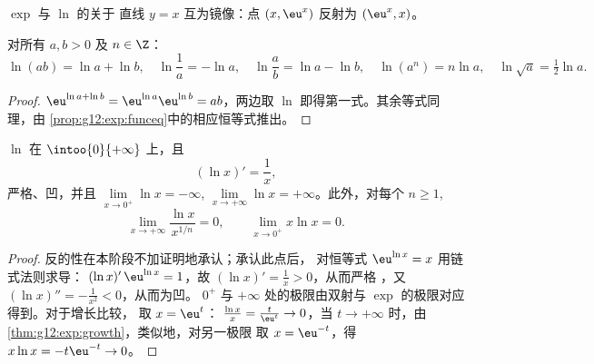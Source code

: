 \begin{omfigure}

{\small $\exp$ 与 $\ln$ 的关于
直线 $y = x$ 互为镜像：点 $(x, \eu^x)$ 反射为 $(\eu^x, x)$。}
\end{omfigure}

\begin{proposition}[代数性质]\label{prop:g12:exp:lnalg}
对所有 $a, b > 0$ 及 $n \in \Z$：
\[
\ln(ab) = \ln a + \ln b, \quad
\ln\frac{1}{a} = -\ln a, \quad
\ln\frac{a}{b} = \ln a - \ln b, \quad
\ln(a^n) = n \ln a, \quad
\ln\sqrt{a} = \tfrac12 \ln a .
\]
\end{proposition}

\begin{proof}
$\eu^{\ln a + \ln b} = \eu^{\ln a}\eu^{\ln b} = ab$，两边取 $\ln$
即得第一式。其余等式同理，由
\cref{prop:g12:exp:funceq}中的相应恒等式推出。
\end{proof}

\begin{proposition}[分析性质]\label{prop:g12:exp:lnanalytic}
 $\ln$ 在 $\intoo{0}{+\infty}$ 上，且
\[
(\ln x)' = \frac{1}{x},
\]
严格、凹，并且
$\lim\limits_{x\to0^+} \ln x = -\infty$,
$\lim\limits_{x\to+\infty} \ln x = +\infty$。此外，对每个
$n \geq 1$,
\[
\lim_{x\to+\infty} \frac{\ln x}{x^{1/n}} = 0, \qquad
\lim_{x\to0^+} x \ln x = 0 .
\]
\end{proposition}

\begin{proof}
反的性在本阶段不加证明地承认；承认此点后，
对恒等式 $\eu^{\ln x} = x$ 用链式法则求导：
$(\ln x)'\,\eu^{\ln x} = 1$，故 $(\ln x)' = \frac{1}{x} > 0$，从而严格
，又 $(\ln x)'' = -\frac1{x^2} < 0$，从而为凹。
$0^+$ 与 $+\infty$ 处的极限由双射与 $\exp$ 的极限对应得到。对于增长比较，
取 $x = \eu^{t}$：
$\frac{\ln x}{x} = \frac{t}{\eu^t} \to 0$，当 $t \to +\infty$ 时，由
\cref{thm:g12:exp:growth}，类似地，对另一极限
取 $x = \eu^{-t}$，得 $x\ln x = -t\eu^{-t} \to 0$。
\end{proof}

